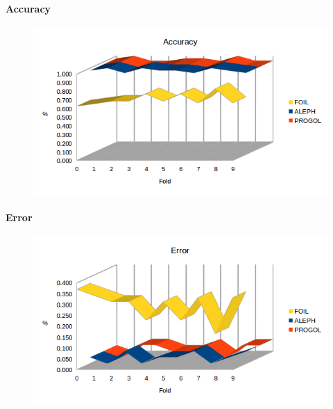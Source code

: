 \paragraph{Accuracy}
\begin{figure}[h!tbp]
	\includegraphics[width=1.2\textwidth]{img/datasetGraph/mlj/nodiscr/accuracy.png}
	\label{mljnodiscr-Accuracy}
\end{figure}
\paragraph{Error}
\begin{figure}[h!tbp]
	\includegraphics[width=1.2\textwidth]{img/datasetGraph/mlj/nodiscr/error.png}
	\label{mljnodiscr-Error}
\end{figure}
